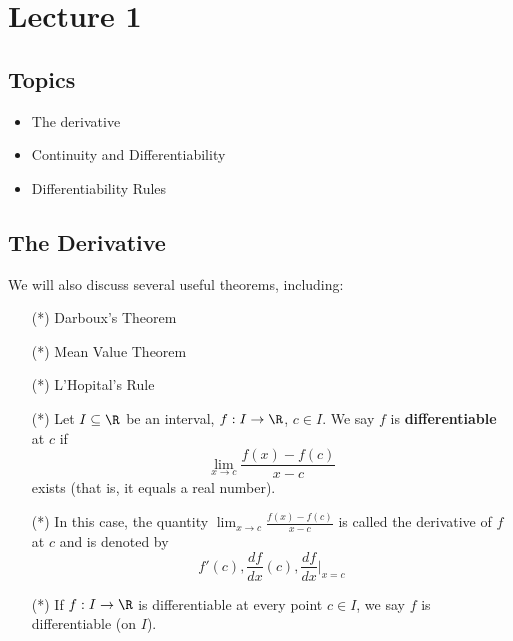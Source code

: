 \section{Lecture 1}

\subsection{Topics}

\begin{itemize}
    \item The derivative
    \item Continuity and Differentiability
    \item Differentiability Rules
\end{itemize}

\subsection{The Derivative}

We will also discuss several useful theorems, including: 

\begin{enumerate}
    \item[(*)] Darboux's Theorem
    \item[(*)] Mean Value Theorem
    \item[(*)] L'Hopital's Rule
\end{enumerate}

\begin{definition}[Differentiability]
    \begin{enumerate}
        \item[(*)] Let \( I \subseteq  \R  \) be an interval, \( f: I \to \R  \), \( c \in I  \). We say \( f  \) is \textbf{differentiable} at \( c  \) if 
    \[  \lim_{ x \to c }  \frac{ f(x) -f(c) }{ x - c  } \]
    exists (that is, it equals a real number).
    \item[(*)] In this case, the quantity \( \lim_{ x \to c }  \frac{ f(x) - f(c) }{ x - c  }  \) is called the derivative of \( f  \) at \( c  \) and is denoted by
        \[  f'(c), \frac{ df }{ dx }(c), \frac{ df }{ dx } \Bigg|_{x = c} \]
    \item[(*)] If \( f: I \to \R  \) is differentiable at every point \( c \in I  \), we say \( f \) is differentiable (on \( I  \)).
    \end{enumerate}
\end{definition}


